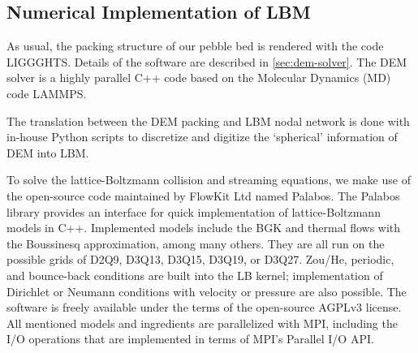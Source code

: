 \subsection{Numerical Implementation of LBM}\label{sec:lbm-solver}

As usual, the packing structure of our pebble bed is rendered with the code LIGGGHTS. Details of the software are described in \cref{sec:dem-solver}. The DEM solver is a highly parallel C++ code based on the Molecular Dynamics (MD) code LAMMPS.\cite{Plimpton1995} 

The translation between the DEM packing and LBM nodal network is done with in-house Python scripts to discretize and digitize the `spherical' information of DEM into LBM.

To solve the lattice-Boltzmann collision and streaming equations, we make use of the open-source code maintained by FlowKit Ltd named Palabos.\cite{Flow} The Palabos library provides an interface for quick implementation of lattice-Boltzmann models in C++. Implemented models include the BGK and thermal flows with the Boussinesq approximation, among many others. They are all run on the possible grids of D2Q9, D3Q13, D3Q15, D3Q19, or D3Q27. Zou/He, periodic, and bounce-back conditions are built into the LB kernel; implementation of Dirichlet or Neumann conditions with velocity or pressure are also possible. The software is freely available under the terms of the open-source AGPLv3 license.\cite{FreeSoftwareFoundationInc.2007} All mentioned models and ingredients are parallelized with MPI, including the I/O operations that are implemented in terms of MPI’s Parallel I/O API.